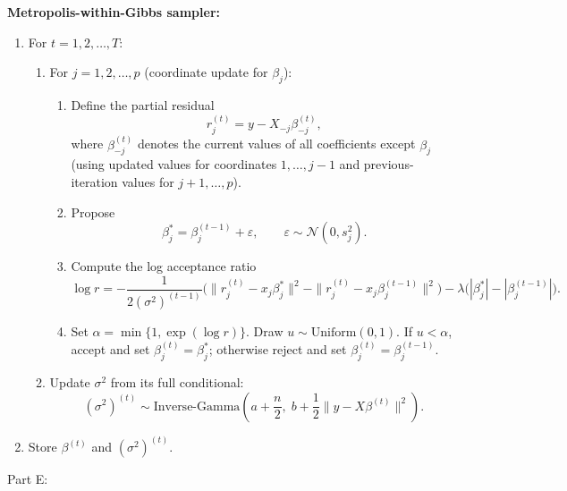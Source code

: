 \documentclass[hidelinks]{article}
\begin{document}
\noindent\textbf{Metropolis-within-Gibbs sampler:}
\begin{enumerate}
\item For $t=1,2,\ldots,T$:
\begin{enumerate}
\item For $j=1,2,\ldots,p$ (coordinate update for $\beta_j$):
\begin{enumerate}
\item Define the partial residual
\[
r_j^{(t)} = y - X_{-j}\beta_{-j}^{(t)} ,
\]
where $\beta_{-j}^{(t)}$ denotes the current values of all coefficients except $\beta_j$ (using updated values for coordinates $1,\ldots,j-1$ and previous-iteration values for $j+1,\ldots,p$).
\item Propose
\[
\beta_j^* = \beta_j^{(t-1)} + \varepsilon,
\qquad
\varepsilon \sim \mathcal{N}(0,s_j^2).
\]
\item Compute the log acceptance ratio
\[
\log r
=
-\frac{1}{2(\sigma^2)^{(t-1)}}
\Big(
\|r_j^{(t)} - x_j\beta_j^*\|^2
-
\|r_j^{(t)} - x_j\beta_j^{(t-1)}\|^2
\Big)
-\lambda\Big(|\beta_j^*|-|\beta_j^{(t-1)}|\Big).
\]
\item Set $\alpha=\min\{1,\exp(\log r)\}$. Draw $u\sim \text{Uniform}(0,1)$.
If $u<\alpha$, accept and set $\beta_j^{(t)}=\beta_j^*$; otherwise reject and set $\beta_j^{(t)}=\beta_j^{(t-1)}$.
\end{enumerate}

\item Update $\sigma^2$ from its full conditional:
\[
(\sigma^2)^{(t)} \sim \text{Inverse-Gamma}\!\left(a+\frac{n}{2},\; b+\frac{1}{2}\|y-X\beta^{(t)}\|^2\right).
\]
\end{enumerate}
\item Store $\beta^{(t)}$ and $(\sigma^2)^{(t)}$.
\end{enumerate}

\noindent Part E:
\end{document}
